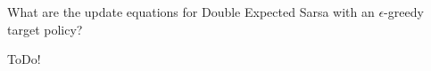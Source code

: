 
\begin{exercise}[Exercise 6.13]

What are the update equations for Double Expected Sarsa with an $\epsilon$-greedy target policy?

\end{exercise}


\begin{solution}

ToDo!

\end{solution}

